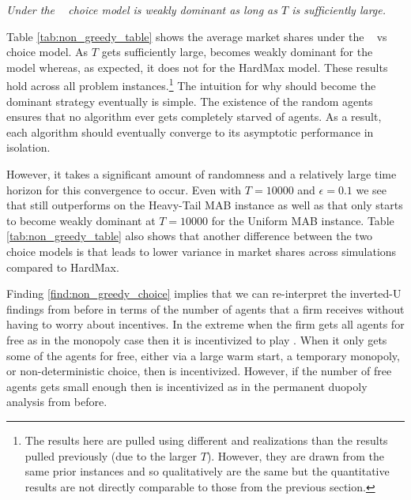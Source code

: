 \documentclass[../competing_bandits.tex]{subfiles}
\begin{document}
\normalsize


\begin{finding}\label{find:non_greedy_choice}
\textit{Under the \HMR~ choice model \TS is weakly dominant as long as $T$ is sufficiently large. }
\end{finding}


Table \ref{tab:non_greedy_table} shows the average market shares under the \HM~ vs \HMR~ choice model. As $T$ gets sufficiently large, \TS becomes weakly dominant for the \HMR model whereas, as expected, it does not for the HardMax model. These results hold across all problem instances.\footnote{The results here are pulled using different \MRV and realizations than the results pulled previously (due to the larger $T$). However, they are drawn from the same prior instances and so qualitatively are the same but the quantitative results are not directly comparable to those from the previous section.} The intuition for why \TS should become the dominant strategy eventually is simple. The existence of the random agents ensures that no algorithm ever gets completely starved of agents. As a result, each algorithm should eventually converge to its asymptotic performance in isolation.

However, it takes a significant amount of randomness and a relatively large time horizon for this convergence to occur. Even with $T = 10000$ and $\epsilon = 0.1$ we see that \DEG still outperforms \DG on the Heavy-Tail MAB instance as well as that \TS only starts to become weakly dominant at $T = 10000$ for the Uniform MAB instance. Table \ref{tab:non_greedy_table} also shows that another difference between the two choice models is that \HMR leads to lower variance in market shares across simulations compared to HardMax.

Finding \ref{find:non_greedy_choice} implies that we can re-interpret the inverted-U findings from before in terms of the number of agents that a firm receives without having to worry about incentives. In the extreme when the firm gets all agents for free as in the monopoly case then it is incentivized to play \DG. When it only gets some of the agents for free, either via a large warm start, a temporary monopoly, or non-deterministic choice, then \TS is incentivized. However, if the number of free agents gets small enough then \DG is incentivized as in the permanent duopoly analysis from before.
\end{document}

